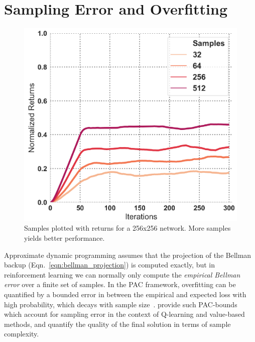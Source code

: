 \section{Sampling Error and Overfitting}
\label{sec:overfitting}


\begin{figure}
\centering
\vspace{-10pt}
\includegraphics[scale=0.27]{chapters/diagnosing_q/images/samples_arch.pdf}
\vspace{-0.2cm}
\caption{\label{fig:sampling_256} Samples plotted with returns for a 256x256 network. More samples yields better performance.}
\vspace{-0.6cm}
\end{figure}

Approximate dynamic programming assumes that the projection of the Bellman backup (Eqn.~\ref{eqn:bellman_projection}) is computed exactly, but in reinforcement learning we can normally only compute the \textit{empirical Bellman error} over a finite set of samples. In the PAC framework, overfitting can be quantified by a bounded error in between the empirical and expected loss with high probability, which decays with sample size~\citep{Shalev2014}. \citet{munos2008finite, maillard2010finite, tosatto2017boosted} provide such PAC-bounds which account for sampling error in the context of Q-learning and value-based methods, and quantify the quality of the final solution in terms of sample complexity.

